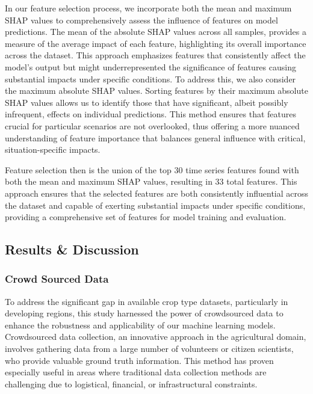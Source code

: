 \documentclass[
  journal,
  twocolumn]{IEEEtran}
\begin{document}
In our feature selection process, we incorporate both the mean and
maximum SHAP values to comprehensively assess the influence of features
on model predictions. The mean of the absolute SHAP values across all
samples, provides a measure of the average impact of each feature,
highlighting its overall importance across the dataset. This approach
emphasizes features that consistently affect the model's output but
might underrepresented the significance of features causing substantial
impacts under specific conditions. To address this, we also consider the
maximum absolute SHAP values. Sorting features by their maximum absolute
SHAP values allows us to identify those that have significant, albeit
possibly infrequent, effects on individual predictions. This method
ensures that features crucial for particular scenarios are not
overlooked, thus offering a more nuanced understanding of feature
importance that balances general influence with critical,
situation-specific impacts.

Feature selection then is the union of the top 30 time series features
found with both the mean and maximum SHAP values, resulting in 33 total
features. This approach ensures that the selected features are both
consistently influential across the dataset and capable of exerting
substantial impacts under specific conditions, providing a comprehensive
set of features for model training and evaluation.

\hypertarget{results-discussion}{%
\subsection{Results \& Discussion}\label{results-discussion}}

\hypertarget{crowd-sourced-data}{%
\subsubsection{Crowd Sourced Data}\label{crowd-sourced-data}}

To address the significant gap in available crop type datasets,
particularly in developing regions, this study harnessed the power of
crowdsourced data to enhance the robustness and applicability of our
machine learning models. Crowdsourced data collection, an innovative
approach in the agricultural domain, involves gathering data from a
large number of volunteers or citizen scientists, who provide valuable
ground truth information. This method has proven especially useful in
areas where traditional data collection methods are challenging due to
logistical, financial, or infrastructural constraints.
\end{document}
